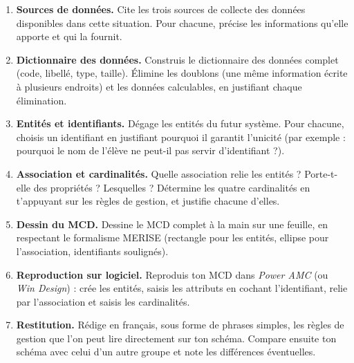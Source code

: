 \documentclass[11pt]{article}
\newcounter{popsec}
\newcounter{popsub}
\newcommand{\courssub}[1]{%
  \stepcounter{popsub}%
  \par\vspace{9pt}\noindent{\popxbold\fontsize{11.5}{13}\selectfont\color{popink}{\color{poporange}\thepopsec.\thepopsub}\hspace{6pt}#1}\par\nopagebreak\vspace{4pt}
}
\begin{document}
\begin{enumerate}
\item \textbf{Sources de données.} Cite les trois sources de collecte des données disponibles dans cette situation. Pour chacune, précise les informations qu'elle apporte et qui la fournit.
\item \textbf{Dictionnaire des données.} Construis le dictionnaire des données complet (code, libellé, type, taille). Élimine les doublons (une même information écrite à plusieurs endroits) et les données calculables, en justifiant chaque élimination.
\item \textbf{Entités et identifiants.} Dégage les entités du futur système. Pour chacune, choisis un identifiant en justifiant pourquoi il garantit l'unicité (par exemple : pourquoi le nom de l'élève ne peut-il pas servir d'identifiant ?).
\item \textbf{Association et cardinalités.} Quelle association relie les entités ? Porte-t-elle des propriétés ? Lesquelles ? Détermine les quatre cardinalités en t'appuyant sur les règles de gestion, et justifie chacune d'elles.
\item \textbf{Dessin du MCD.} Dessine le MCD complet à la main sur une feuille, en respectant le formalisme MERISE (rectangle pour les entités, ellipse pour l'association, identifiants soulignés).
\item \textbf{Reproduction sur logiciel.} Reproduis ton MCD dans \emph{Power AMC} (ou \emph{Win Design}) : crée les entités, saisis les attributs en cochant l'identifiant, relie par l'association et saisis les cardinalités.
\item \textbf{Restitution.} Rédige en français, sous forme de phrases simples, les règles de gestion que l'on peut lire directement sur ton schéma. Compare ensuite ton schéma avec celui d'un autre groupe et note les différences éventuelles.
\end{enumerate}

\courssub{Ressources à mobiliser}
\end{document}
